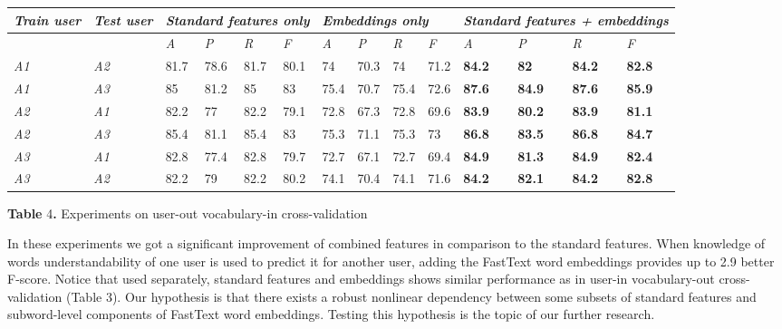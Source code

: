 \begin{tabular}{|p{0.3in}|p{0.2in}|p{0.2in}|p{0.2in}|p{0.2in}|p{0.2in}|p{0.2in}|p{0.2in}|p{0.2in}|p{0.2in}|p{0.2in}|p{0.2in}|p{0.2in}|p{0.2in}|} \hline 
\textit{Train user} & \textit{Test user} & \multicolumn{4}{|p{0.8in}|}{\textit{Standard features only}} & \multicolumn{4}{|p{0.8in}|}{\textit{Embeddings only}} & \multicolumn{4}{|p{0.8in}|}{\textit{Standard features + embeddings}} \\ \hline 
\textit{} & \textit{} & \textit{A} & \textit{P} & \textit{R} & \textit{F} & \textit{A} & \textit{P} & \textit{R} & \textit{F} & \textit{A} & \textit{P} & \textit{R} & \textit{F} \\ \hline 
\textit{A1} & \textit{A2} & 81.7 & 78.6 & 81.7 & 80.1 & 74 & 70.3 & 74 & 71.2 & \textbf{84.2} & \textbf{82} & \textbf{84.2} & \textbf{82.8} \\ \hline 
\textit{A1} & \textit{A3} & 85 & 81.2 & 85 & 83 & 75.4 & 70.7 & 75.4 & 72.6 & \textbf{87.6} & \textbf{84.9} & \textbf{87.6} & \textbf{85.9} \\ \hline 
\textit{A2} & \textit{A1} & 82.2 & 77 & 82.2 & 79.1 & 72.8 & 67.3 & 72.8 & 69.6 & \textbf{83.9} & \textbf{80.2} & \textbf{83.9} & \textbf{81.1} \\ \hline 
\textit{A2} & \textit{A3} & 85.4 & 81.1 & 85.4 & 83 & 75.3 & 71.1 & 75.3 & 73 & \textbf{86.8} & \textbf{83.5} & \textbf{86.8} & \textbf{84.7} \\ \hline 
\textit{A3} & \textit{A1} & 82.8 & 77.4 & 82.8 & 79.7 & 72.7 & 67.1 & 72.7 & 69.4 & \textbf{84.9} & \textbf{81.3} & \textbf{84.9} & \textbf{82.4} \\ \hline 
\textit{A3} & \textit{A2} & 82.2 & 79 & 82.2 & 80.2 & 74.1 & 70.4 & 74.1 & 71.6 & \textbf{84.2} & \textbf{82.1} & \textbf{84.2} & \textbf{82.8} \\ \hline 
\end{tabular}

\textbf{Table }4\textbf{.} Experiments on user-out vocabulary-in cross-validation


In these experiments we got a significant improvement of combined features in comparison to the standard features. When knowledge of words understandability of one user is used to predict it for another user, adding the FastText word embeddings provides up to 2.9 better F-score. Notice that used separately, standard features and embeddings shows similar performance as in user-in vocabulary-out cross-validation (Table 3). Our hypothesis is that there exists a robust nonlinear dependency between some subsets of standard features and subword-level components of FastText word embeddings. Testing this hypothesis is the topic of our further research.

